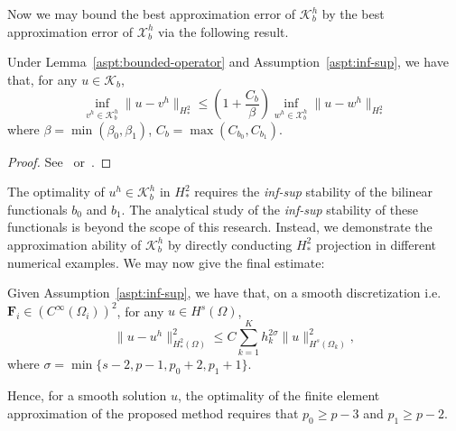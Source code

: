 Now we may bound the best approximation error of $\mathcal{K}_b^h$ by the best approximation error of $\mathcal{X}_b^h$ via the following result.
\begin{theorem}
  Under Lemma~\ref{aspt:bounded-operator} and Assumption~\ref{aspt:inf-sup}, we have that, for any $u\in\mathcal{K}_b$,
  \begin{equation}
    \inf_{v^h\in{\mathcal{K}_b^h}}\|{u-v^h}\|_{H^2_*}\leq\left({1+\frac{C_b}{\beta}}\right)\inf_{w^h\in{\mathcal{X}_b^h}}\|{u-w^h}\|_{H^2_*}
  \end{equation}
  where $\beta=\min\left({\beta_{0},\beta_{1}}\right)$, $C_b=\max\left({C_{b_0},C_{b_1}}\right)$.
  \begin{proof}
    See~\cite{brenner_mathematical_2007} or~\cite{boffi_mixed_2013}.
  \end{proof}
\end{theorem}

The optimality of $u^h\in\mathcal{K}_b^h$ in $H^2_*$ requires the \textit{inf-sup} stability of the bilinear functionals $b_0$ and $b_1$. The analytical study of the \textit{inf-sup} stability of these functionals is beyond the scope of this research. Instead, we demonstrate the approximation ability of $\mathcal{K}_b^h$ by directly conducting $H^2_*$ projection in different numerical examples. We may now give the final estimate:
\begin{theorem}\label{thm:approximation-of-bezier-formulation}
  Given Assumption~\ref{aspt:inf-sup}, we have that, on a smooth discretization i.e. $\mathbf{F}_i\in \left(C^\infty(\Omega_i)\right)^2$, for any $u\in H^s(\Omega)$,
  \begin{equation}
    \|u-u^h\|_{H^2_*(\Omega)}^2 \leq C \sum_{k=1}^K h_k^{2\sigma}\|u\|^2_{H^s(\Omega_k)},
  \end{equation}
  where $\sigma=\min\{s-2,p-1,p_0+2,p_1+1\}$.
\end{theorem}
Hence, for a smooth solution $u$, the optimality of the finite element approximation of the proposed method requires that $p_0\geq p-3$ and $p_1\geq p-2$.

